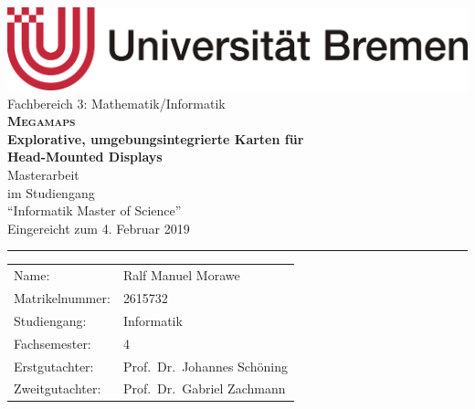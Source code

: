 \begin{titlepage}
\begin{center}
    \includegraphics[width=0.5\linewidth]{figures/Universitaet_Bremen}\\\vspace{0.3cm}
    \large Fachbereich 3: Mathematik/Informatik\\
    \vspace{2cm}
    \LARGE\textsf{\textbf{\textsc{Megamaps}}}\\
    \Large\textsf{\textbf{Explorative, umgebungsintegrierte Karten für \\Head-Mounted Displays}} \\
    \vspace{2cm}
    \LARGE Masterarbeit\\
    \vspace{1cm}
    \large
    im Studiengang\\
    \enquote{Informatik Master of Science}\\
    \vspace{2cm}
    \normalsize
    Eingereicht zum 4. Februar 2019\\
    \vspace{3.5cm}
\end{center}
\vfill
\noindent
\hrule
\vspace{1em}
\begin{tabular}{ll}
    Name: & {Ralf Manuel Morawe} \\
    Matrikelnummer: & {2615732} \\
    Studiengang: & Informatik\\
    Fachsemester: & 4\\
    Erstgutachter: & {Prof.\ Dr.\ Johannes Schöning} \\
    Zweitgutachter: & {Prof.\ Dr.\ Gabriel Zachmann}
\end{tabular}
\end{titlepage}
\cleardoublepage
